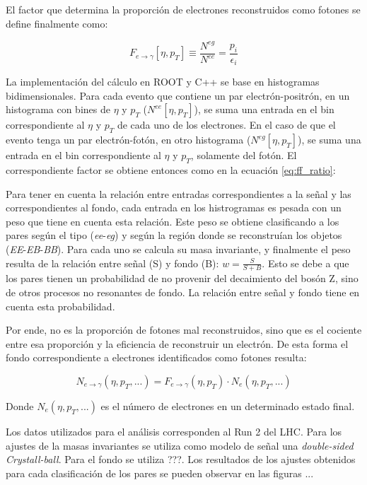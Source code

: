 El factor que determina la proporción de electrones reconstruidos como fotones se define finalmente como:

\begin{equation}
F_{e\rightarrow\gamma}[\eta , p_{T}]\equiv\frac{N^{eg}}{N^{ee}}=\frac{p_{i}}{\epsilon_{i}}
\end{equation}


La implementación del cálculo en ROOT y C++ se  base en histogramas bidimensionales. Para cada evento que contiene un par electrón-positrón, en un histograma con bines de $\eta$ y $p_{T}$ ($N^{ee}[\eta , p_{T}]$), se suma una entrada en el bin correspondiente al $\eta$ y $p_{T}$ de cada uno de los electrones. En el caso de que el evento tenga un par electrón-fotón, en otro histograma ($N^{eg}[\eta , p_{T}]$), se suma una entrada en el bin correspondiente al $\eta$ y $p_{T}$, solamente del fotón. El correspondiente factor se obtiene entonces como en la ecuación \ref{eq:ff_ratio}:

Para tener en cuenta la relación entre entradas correspondientes a la señal y las correspondientes al fondo, cada entrada en los histrogramas es pesada con un peso que tiene en cuenta esta relación. Este peso se obtiene clasificando a los pares según el tipo (\textit{ee}-\textit{eg}) y según la región donde se reconstruían los objetos (\textit{EE}-\textit{EB}-\textit{BB}). Para cada uno se calcula su masa invariante, y finalmente el peso resulta de la relación entre señal (S) y fondo (B): $w=\frac{S}{S+B}$. Esto se debe a que los pares tienen un probabilidad de no provenir del decaimiento del bosón Z, sino de otros procesos no resonantes de fondo. La relación entre señal y fondo tiene en cuenta esta probabilidad.

Por ende, no es la proporción de fotones mal reconstruidos, sino que es el cociente entre esa proporción y la eficiencia de reconstruir un electrón. De esta forma el fondo correspondiente a electrones identificados como fotones resulta:

\begin{equation}
N_{e\rightarrow\gamma}(\eta , p_{T} , ... )=F_{e\rightarrow\gamma}(\eta , p_{T})\cdot N_{e}(\eta , p_{T} , ...)
\end{equation}
	
Donde $N_{e}(\eta , p_{T} , ...)$ es el número de electrones en un determinado estado final.

Los datos utilizados para el análisis corresponden al Run 2 del LHC. Para los ajustes de la masas invariantes se utiliza como modelo de señal una \textit{double-sided Crystall-ball}. Para el fondo se utiliza ???. Los resultados de los ajustes obtenidos para cada clasificación de los pares se pueden observar en las figuras ...

